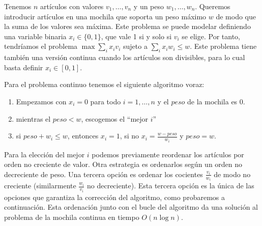 \documentclass[AL.tex]{subfiles}
\begin{document}
\begin{ej}
Tenemos $n$ artículos con valores $v_1,\dots, v_n$ y un peso $w_1,\dots, w_n$. Queremos introducir artículos en una mochila que soporta un peso máximo $w$ de modo que la suma de los valores sea máxima. Este problema se puede modelar definiendo una variable binaria $x_i\in\{0,1\}$, que vale 1 si y solo si $v_i$ se elige. Por tanto, tendríamos el problema $\max\sum_i x_iv_i$ sujeto a $\sum_ix_iw_i\leq w$. Este problema tiene también una versión continua cuando los artículos son divisibles, para lo cual basta definir $x_i\in[0,1]$. 

Para el problema continuo tenemos el siguiente algoritmo voraz:
\begin{enumerate}
\item Empezamos con $x_i=0$ para todo $i=1,\dots, n$ y el $peso$ de la mochila es 0. 
\item mientras el $peso<w$, escogemos el ``mejor $i$''
\item si $peso+w_i\leq w$, entonces $x_i=1$, si no $x_i=\frac{w-peso}{w_i}$ y $peso=w$.
\end{enumerate}

Para la elección del mejor $i$ podemos previamente reordenar los artículos por orden no creciente de valor. Otra estrategia es ordenarlos según un orden no decreciente de peso. Una tercera opción es ordenar los cocientes $\frac{v_i}{w_i}$ de modo no creciente (similarmente $\frac{w_i}{v_i}$ no decreciente). Esta tercera opción es la única de las opciones que garantiza la corrección del algoritmo, como probaremos a continuación. Esta ordenación junto con el bucle del algoritmo da una solución al problema de la mochila continua en tiempo $O(n\log n)$. 

\end{ej}
\end{document}
